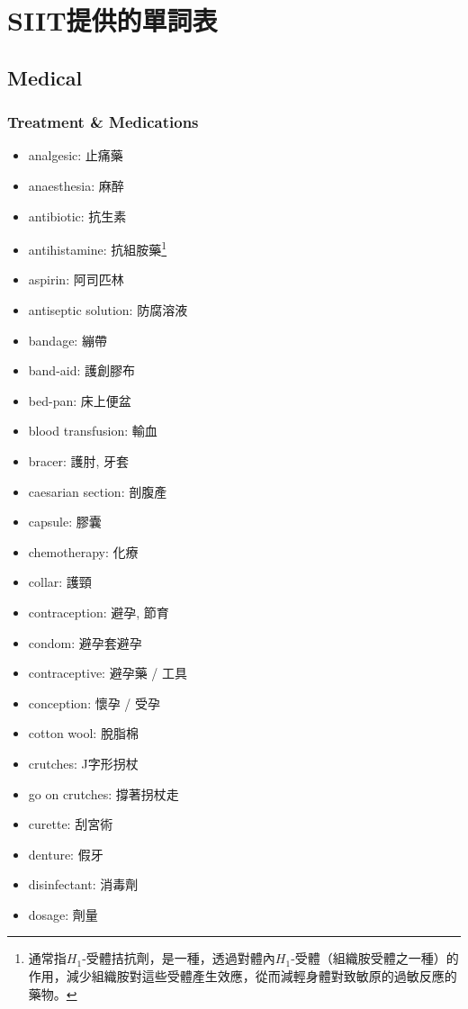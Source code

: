 \chapter{SIIT提供的單詞表}
\section{Medical}
\subsection{Treatment \& Medications}
\begin{multicols}{2}
\begin{itemize}
  \itemsep0em
  \item analgesic: 止痛藥
  \item anaesthesia: 麻醉
  \item antibiotic: 抗生素
  \item antihistamine: 抗組胺藥\footnote{通常指$H_1$-受體拮抗劑，是一種，透過對體內$H_1$-受體（組織胺受體之一種）的作用，減少組織胺對這些受體產生效應，從而減輕身體對致敏原的過敏反應的藥物。}
  \item aspirin: 阿司匹林
  \item antiseptic solution: 防腐溶液
  \item bandage: 繃帶
  \item band-aid: 護創膠布
  \item bed-pan: 床上便盆
  \item blood transfusion: 輸血
  \item bracer: 護肘, 牙套
  \item caesarian section: 剖腹產
  \item capsule: 膠囊
  \item chemotherapy: 化療
  \item collar: 護頸
  \item contraception: 避孕, 節育
  \item condom: 避孕套避孕
  \item contraceptive: 避孕藥 / 工具
  \item conception: 懷孕 / 受孕
  \item cotton wool: 脫脂棉
  \item crutches: J字形拐杖
  \item go on crutches: 撐著拐杖走
  \item curette: 刮宮術
  \item denture: 假牙
  \item disinfectant: 消毒劑
  \item dosage: 劑量

\end{itemize}
\end{multicols}
